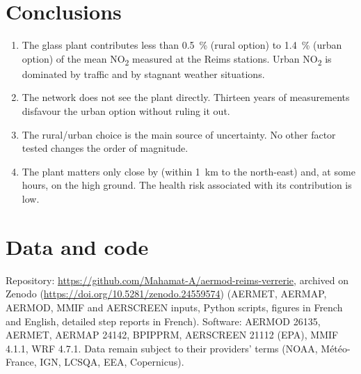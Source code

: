 \documentclass[11pt,a4paper]{article}
\newcommand{\NOd}{NO\textsubscript{2}}
\begin{document}
\section{Conclusions}
\begin{enumerate}
\item The glass plant contributes less than 0.5~\% (rural option) to 1.4~\% (urban option) of the mean \NOd{}
measured at the Reims stations. Urban \NOd{} is dominated by traffic and by stagnant weather situations.
\item The network does not see the plant directly. Thirteen years of measurements disfavour the urban option without
ruling it out.
\item The rural/urban choice is the main source of uncertainty. No other factor tested changes the order of
magnitude.
\item The plant matters only close by (within 1~km to the north-east) and, at some hours, on the high ground. The
health risk associated with its contribution is low.
\end{enumerate}

\section{Data and code}\label{sec:repro}
Repository: \url{https://github.com/Mahamat-A/aermod-reims-verrerie}, archived on Zenodo
(\url{https://doi.org/10.5281/zenodo.24559574}) (AERMET, AERMAP, AERMOD, MMIF and AERSCREEN inputs, Python scripts,
figures in French and English, detailed step reports in French). Software: AERMOD 26135, AERMET, AERMAP 24142, BPIPPRM, AERSCREEN 21112
(EPA), MMIF 4.1.1, WRF 4.7.1. Data remain subject to their providers' terms (NOAA, Météo-France, IGN, LCSQA, EEA,
Copernicus).
\end{document}
